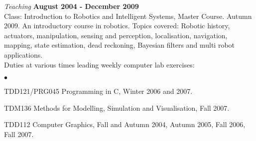 \documentclass[a4paper,margin,line]{res} \usepackage{latexsym}
\newenvironment{list2}{
  \begin{list}{$\bullet$}{%
      \setlength{\itemsep}{0in} \setlength{\parsep}{0in}
      \setlength{\parskip}{0in} \setlength{\topsep}{0in}
      \setlength{\partopsep}{0in}
      \setlength{\leftmargin}{0.2in}}}{\end{list}}
\begin{document}
\begin{resume}



{\em Teaching} \hfill {\bf August 2004 - December
  2009}\\ Class: Introduction to Robotics and Intelligent Systems, Master
Course. Autumn 2009. An introductory course in robotics. Topics
covered: Robotic history, actuators, manipulation, sensing and
perception, localisation, navigation, mapping, state estimation, dead
reckoning, Bayesian filters and multi robot applications.
\\ Duties at various times leading weekly computer lab exercises:

\vspace*{.05in}
\begin{list2}
\item TDD121/PRG045 Programming in C, Winter 2006 and 2007.
\item TDM136 Methods for Modelling, Simulation and Visualisation, Fall
  2007.
\item TDD112 Computer Graphics, Fall and Autumn 2004, Autumn 2005,
  Fall 2006, Fall 2007.
\end{list2}





\end{resume}
\end{document}
